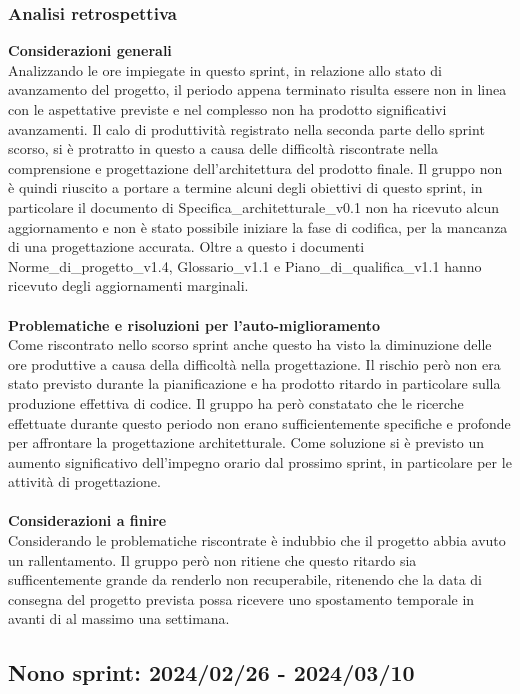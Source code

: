 \subsubsection{Analisi retrospettiva}
\textbf{Considerazioni generali}\\
Analizzando le ore impiegate in questo sprint, in relazione allo stato di avanzamento del progetto, il periodo appena terminato risulta essere non in linea con le aspettative previste e nel complesso non ha prodotto significativi avanzamenti. Il calo di produttività registrato nella seconda parte dello sprint scorso, si è protratto in questo a causa delle difficoltà riscontrate nella comprensione e progettazione dell'architettura del prodotto finale. Il gruppo non è quindi riuscito a portare a termine alcuni degli obiettivi di questo sprint, in particolare il documento di Specifica\_architetturale\_v0.1 non ha ricevuto alcun aggiornamento e non è stato possibile iniziare la fase di codifica, per la mancanza di una progettazione accurata. Oltre a questo i documenti Norme\_di\_progetto\_v1.4, Glossario\_v1.1 e Piano\_di\_qualifica\_v1.1 hanno ricevuto degli aggiornamenti marginali. \\ \\
\textbf{Problematiche e risoluzioni per l'auto-miglioramento}\\
Come riscontrato nello scorso sprint anche questo ha visto la diminuzione delle ore produttive a causa della difficoltà nella progettazione. Il rischio però non era stato previsto durante la pianificazione e ha prodotto ritardo in particolare sulla produzione effettiva di codice. Il gruppo ha però constatato che le ricerche effettuate durante questo periodo non erano sufficientemente specifiche e profonde per affrontare la progettazione architetturale. Come soluzione si è previsto un aumento significativo dell'impegno orario dal prossimo sprint, in particolare per le attività di progettazione.\\ \\
\textbf{Considerazioni a finire}\\
Considerando le problematiche riscontrate è indubbio che il progetto abbia avuto un rallentamento. Il gruppo però non ritiene che questo ritardo sia sufficentemente grande da renderlo non recuperabile, ritenendo che la data di consegna del progetto prevista possa ricevere uno spostamento temporale in avanti di al massimo una settimana.

\newpage
\subsection{Nono sprint: 2024/02/26 - 2024/03/10}
